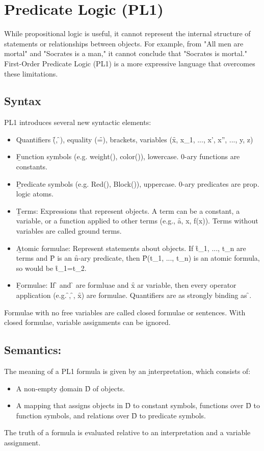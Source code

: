 \section{Predicate Logic (PL1)}
While propositional logic is useful, it cannot represent the internal structure of statements or relationships between objects. For example, from "All men are mortal" and "Socrates is a man," it cannot conclude that "Socrates is mortal." First-Order Predicate Logic (PL1) is a more expressive language that overcomes these limitations.

\subsection{Syntax}
PL1 introduces several new syntactic elements:
\begin{itemize}
    \item Quantifiers (\f{\forall}, \f{\exists}), equality (\f{=}), brackets, variables (\f{x, x_1, ..., x', x'', ..., y, z})
    \item \b{Function symbols} (e.g. weight(), color()), lowercase. 0-ary functions are constants.
    \item \b{Predicate symbols} (e.g. Red(), Block()), uppercase. 0-ary predicates are prop. logic atoms.
    \item \b{Terms:} Expressions that represent objects. A term can be a constant, a variable, or a function applied to other terms (e.g., \f{a, x, f(x)}). Terms without variables are called \b{ground terms}.
    \item \b{Atomic formulae:} Represent statements about objects. If \f{t_1, ..., t_n} are terms and \f{P} is an \f{n}-ary predicate, then \f{P(t_1, ..., t_n)} is an atomic formula, so would be \f{t_1=t_2}.
    \item \b{Formulae:} If \f{\phi} and \f{\psi} are formluae and \f{x} ar variable, then every operator application (e.g. \f{\neg\phi}, \f{\phi\wedge\psi}, \f{\exists x\psi}) are formulae. Quantifiers are as strongly binding as \f{\neg}.
\end{itemize}
Formulae with no free variables are called closed formulae or sentences. With closed formulae, variable assignments can be ignored.

\subsection{Semantics:}
The meaning of a PL1 formula is given by an \b{interpretation}, which consists of:
\begin{itemize}
    \item A non-empty \b{domain} \f{D} of objects.
    \item A mapping that assigns objects in \f{D} to constant symbols, functions over \f{D} to function symbols, and relations over \f{D} to predicate symbols.
\end{itemize}
The truth of a formula is evaluated relative to an interpretation and a variable assignment.

